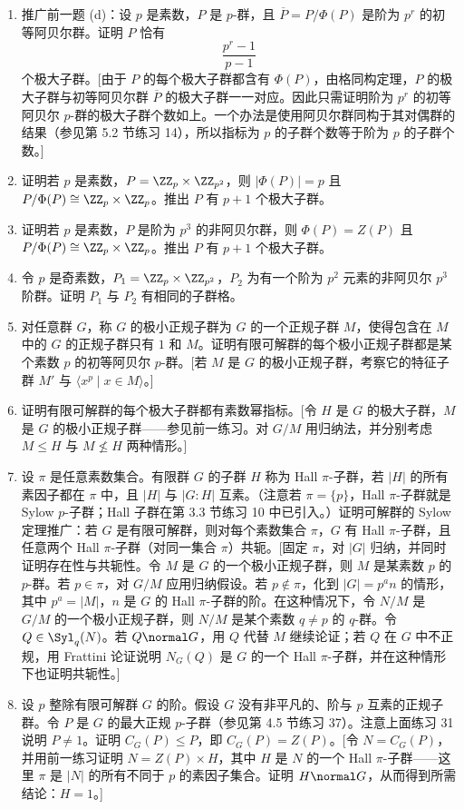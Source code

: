 \begin{enumerate}[label=\arabic*.,resume]
  \item 推广前一题 (d)：设 $p$ 是素数，$P$ 是 $p$-群，且 $\overline P=P/\Phi(P)$ 是阶为 $p^r$ 的初等阿贝尔群。证明 $P$ 恰有
  \[
    \frac{p^r-1}{p-1}
  \]
  个极大子群。[由于 $P$ 的每个极大子群都含有 $\Phi(P)$，由格同构定理，$P$ 的极大子群与初等阿贝尔群 $\overline P$ 的极大子群一一对应。因此只需证明阶为 $p^r$ 的初等阿贝尔 $p$-群的极大子群个数如上。一个办法是使用阿贝尔群同构于其对偶群的结果（参见第 5.2 节练习 14），所以指标为 $p$ 的子群个数等于阶为 $p$ 的子群个数。]
  \item 证明若 $p$ 是素数，$P=\ZZ_p\times\ZZ_{p^2}$，则 $|\Phi(P)|=p$ 且 $P/\Phi(P)\cong \ZZ_p\times\ZZ_p$。推出 $P$ 有 $p+1$ 个极大子群。
  \item 证明若 $p$ 是素数，$P$ 是阶为 $p^3$ 的非阿贝尔群，则 $\Phi(P)=Z(P)$ 且 $P/\Phi(P)\cong \ZZ_p\times\ZZ_p$。推出 $P$ 有 $p+1$ 个极大子群。
  \item 令 $p$ 是奇素数，$P_1=\ZZ_p\times\ZZ_{p^2}$，$P_2$ 为有一个阶为 $p^2$ 元素的非阿贝尔 $p^3$ 阶群。证明 $P_1$ 与 $P_2$ 有相同的子群格。
  \item 对任意群 $G$，称 $G$ 的极小正规子群为 $G$ 的一个正规子群 $M$，使得包含在 $M$ 中的 $G$ 的正规子群只有 $1$ 和 $M$。证明有限可解群的每个极小正规子群都是某个素数 $p$ 的初等阿贝尔 $p$-群。[若 $M$ 是 $G$ 的极小正规子群，考察它的特征子群 $M'$ 与 $\langle x^p\mid x\in M\rangle$。]
  \item 证明有限可解群的每个极大子群都有素数幂指标。[令 $H$ 是 $G$ 的极大子群，$M$ 是 $G$ 的极小正规子群——参见前一练习。对 $G/M$ 用归纳法，并分别考虑 $M\leq H$ 与 $M\nleq H$ 两种情形。]
  \item 设 $\pi$ 是任意素数集合。有限群 $G$ 的子群 $H$ 称为 Hall $\pi$-子群，若 $|H|$ 的所有素因子都在 $\pi$ 中，且 $|H|$ 与 $|G:H|$ 互素。（注意若 $\pi=\{p\}$，Hall $\pi$-子群就是 Sylow $p$-子群；Hall 子群在第 3.3 节练习 10 中已引入。）证明可解群的 Sylow 定理推广：若 $G$ 是有限可解群，则对每个素数集合 $\pi$，$G$ 有 Hall $\pi$-子群，且任意两个 Hall $\pi$-子群（对同一集合 $\pi$）共轭。[固定 $\pi$，对 $|G|$ 归纳，并同时证明存在性与共轭性。令 $M$ 是 $G$ 的一个极小正规子群，则 $M$ 是某素数 $p$ 的 $p$-群。若 $p\in\pi$，对 $G/M$ 应用归纳假设。若 $p\notin\pi$，化到 $|G|=p^a n$ 的情形，其中 $p^a=|M|$，$n$ 是 $G$ 的 Hall $\pi$-子群的阶。在这种情况下，令 $N/M$ 是 $G/M$ 的一个极小正规子群，则 $N/M$ 是某个素数 $q\neq p$ 的 $q$-群。令 $Q\in\Syl_q(N)$。若 $Q\normal G$，用 $Q$ 代替 $M$ 继续论证；若 $Q$ 在 $G$ 中不正规，用 Frattini 论证说明 $N_G(Q)$ 是 $G$ 的一个 Hall $\pi$-子群，并在这种情形下也证明共轭性。]
  \item 设 $p$ 整除有限可解群 $G$ 的阶。假设 $G$ 没有非平凡的、阶与 $p$ 互素的正规子群。令 $P$ 是 $G$ 的最大正规 $p$-子群（参见第 4.5 节练习 37）。注意上面练习 31 说明 $P\neq1$。证明 $C_G(P)\leq P$，即 $C_G(P)=Z(P)$。[令 $N=C_G(P)$，并用前一练习证明 $N=Z(P)\times H$，其中 $H$ 是 $N$ 的一个 Hall $\pi$-子群——这里 $\pi$ 是 $|N|$ 的所有不同于 $p$ 的素因子集合。证明 $H\normal G$，从而得到所需结论：$H=1$。]

\end{enumerate}
